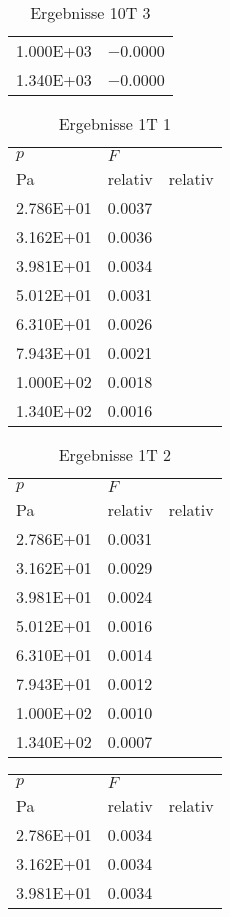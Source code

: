 \begin{table}
\begin{tabular}{l l }
\num{1.000E+03}&\num{-0.0000}\\
\num{1.340E+03}&\num{-0.0000}\\
\bottomrule
\end{tabular}\caption{Ergebnisse 10T 3}\end{table}\begin{table}\begin{tabular}{l l }
\toprule
$p$&$F$\\
 Pa & relativ & relativ\\\midrule
\num{2.786E+01}&\num{0.0037}\\
\num{3.162E+01}&\num{0.0036}\\
\num{3.981E+01}&\num{0.0034}\\
\num{5.012E+01}&\num{0.0031}\\
\num{6.310E+01}&\num{0.0026}\\
\num{7.943E+01}&\num{0.0021}\\
\num{1.000E+02}&\num{0.0018}\\
\num{1.340E+02}&\num{0.0016}\\
\bottomrule
\end{tabular}\caption{Ergebnisse 1T 1}\end{table}\begin{table}\begin{tabular}{l l }
\toprule
$p$&$F$\\
 Pa & relativ & relativ\\\midrule
\num{2.786E+01}&\num{0.0031}\\
\num{3.162E+01}&\num{0.0029}\\
\num{3.981E+01}&\num{0.0024}\\
\num{5.012E+01}&\num{0.0016}\\
\num{6.310E+01}&\num{0.0014}\\
\num{7.943E+01}&\num{0.0012}\\
\num{1.000E+02}&\num{0.0010}\\
\num{1.340E+02}&\num{0.0007}\\
\bottomrule
\end{tabular}\caption{Ergebnisse 1T 2}\end{table}\begin{table}\begin{tabular}{l l }
\toprule
$p$&$F$\\
 Pa & relativ & relativ\\\midrule
\num{2.786E+01}&\num{0.0034}\\
\num{3.162E+01}&\num{0.0034}\\
\num{3.981E+01}&\num{0.0034}\\

\end{tabular}
\end{table}
